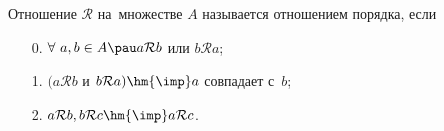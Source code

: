 \label{op}
    Отношение $\mathcal R$ на~множестве $A$ называется отношением порядка, если

    \begin{itemize}
        \item[0.] \label{0}$\forall\  a,b\in A\pau a\mathcal Rb$ или $b\mathcal Ra$;

        \item[1.] $(a\mathcal Rb$ и $b\mathcal Ra)\hm{\imp} a$ совпадает с~$b$;

        \item[2.] $a\mathcal Rb,b\mathcal Rc   \hm{\imp} a\mathcal Rc$.
    \end{itemize}

